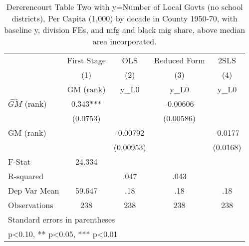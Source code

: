 \begin{table}[htbp]\centering
\def\sym#1{\ifmmode^{#1}\else\(^{#1}\)\fi}
\caption{Dererencourt Table Two with y=Number of Local Govts (no school districts), Per Capita (1,000) by decade in County 1950-70, with baseline y, division FEs, and mfg and black mig share, above median area incorporated.}
\begin{tabular}{l*{4}{c}}
\toprule
                    & First Stage   &         OLS   &Reduced Form   &        2SLS   \\
                    &\multicolumn{1}{c}{(1)}&\multicolumn{1}{c}{(2)}&\multicolumn{1}{c}{(3)}&\multicolumn{1}{c}{(4)}\\
                    &\multicolumn{1}{c}{GM  (rank)}&\multicolumn{1}{c}{y\_L0}&\multicolumn{1}{c}{y\_L0}&\multicolumn{1}{c}{y\_L0}\\
\midrule
$\hat{GM}$ (rank)   &       0.343***&               &    -0.00606   &               \\
                    &    (0.0753)   &               &   (0.00586)   &               \\
\addlinespace
GM  (rank)          &               &    -0.00792   &               &     -0.0177   \\
                    &               &   (0.00953)   &               &    (0.0168)   \\
\midrule
F-Stat              &      24.334   &               &               &               \\
R-squared           &               &        .047   &        .043   &               \\
Dep Var Mean        &      59.647   &         .18   &         .18   &         .18   \\
Observations        &         238   &         238   &         238   &         238   \\
\bottomrule
\multicolumn{5}{l}{\footnotesize Standard errors in parentheses}\\
\multicolumn{5}{l}{\footnotesize * p<0.10, ** p<0.05, *** p<0.01}\\
\end{tabular}
\end{table}
